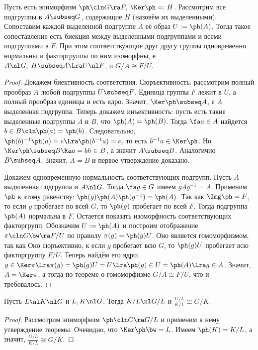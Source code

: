 \documentclass[a4paper]{article}
\begin{document}
\begin{theorem}[О соответствии]
Пусть есть эпиморфизм $\ph\cln G \ra F, \; \Ker \ph =: H$. Рассмотрим все подгруппы в $A \subseq G$, содержащие
$H$ (назовём их выделенными). Сопоставим каждой выделенной подгруппе $A$ её образ $U := \ph(A)$.  Тогда такое
сопоставление есть биекция между выделенными подгруппами и всеми подгруппами в $F$. При этом соответствующие
друг другу группы одновременно нормальны и факторгруппы по ним изоморфны, е $A \nl G, \; H \subseq A \Lra
U \nl F$, и $ G/A \cong F/U$.
\end{theorem}
\begin{proof}
Докажем биективность соответствия. Сюръективность: рассмотрим полный прообраз $A$ любой подгруппы  $U \subseq
F$. Единица группы $F$ лежит в $U$, а полный прообраз единицы и есть ядро. Значит, $\Ker \ph \subseq A$,
е $A$ выделенная подгруппа. Теперь докажем инъективность: пусть есть такие выделенные подгруппы $A$ и
$B$, что $\ph(A)=\ph(B)$. Тогда $\fa a \in A$ найдется $b \in B\cln \ph(a)=\ph(b)$. Следовательно,
$\ph(b)^{-1}\ph(a)=e \Lra \ph(b^{-1}a) = e$, то есть $b^{-1}a \in \Ker\ph$. Но $\Ker\ph \subseq B \Ra a = bh
\in B$, а значит $A \subseq B$. Аналогично $B \subseq A$. Значит, $A=B$ и первое утверждение доказано.

Докажем одновременную нормальность соответствующих подгрупп. Пусть $A$ выделенная подгруппа и $A \nl G$.
Тогда $\fa g \in G$ имеем $gAg^{-1}=A$. Применим $\ph$ к этому равенству: $\ph(g)\ph(A)\ph(g^{-1})=\ph(A)$.
Так как ${\Img \ph=F}$, то если $g$ пробегает по всей $G$, то $\ph(g)$ пробегает по всей $F$. Тогда подгруппа
$\ph(A)$ нормальна в $F$. Остается показать изоморфность соответствующих факторгрупп. Обозначим $U := \ph(A)$
и построим отображение $\pi\cln G \bw\ra F/U$ по правилу $\pi(g) = \ph(g)U$. Оно является гомоморфизмом, так как
Оно сюръективно, к если $g$ пробегает всю $G$, то $\ph(g)U$ пробегает всю факторгруппу
$F/U$. Теперь найдём его ядро: $g \in \Ker\pi \Lra \pi(g)=\ph(g)U=U \Lra \ph(g) \in U=\ph(A) \Lra g \in A$.
Значит, $A=\Ker\pi$, а тогда по теореме о гомоморфизме $G/A \cong F/U$, что и требовалось.
\end{proof}

\begin{imp}
Пусть $L \nl K \nl G$ и $ L, K \nl G$. Тогда $K/L \nl G/L$ и $\frac{G/L}{K/L} \cong G/K$.
\end{imp}
\begin{proof}
Рассмотрим эпиморфизм $\ph\cln G \ra G/L$ и применим к нему утверждение теоремы. Очевидно, что $\Ker\ph \bw= L$.
Имеем $\ph(K) = K/L$, а значит, $\frac{G/L}{K/L} \cong G/K$.
\end{proof}
\end{document}
